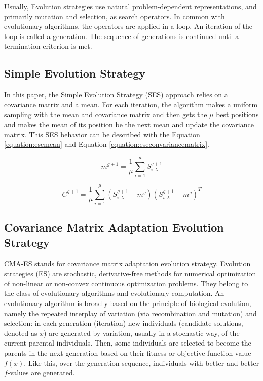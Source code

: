 Usually, Evolution strategies use natural problem-dependent representations, and primarily mutation and selection, as search operators. In common with evolutionary algorithms, the operators are applied in a loop. An iteration of the loop is called a generation. The sequence of generations is continued until a termination criterion is met.

\subsection{Simple Evolution Strategy}

In this paper, the Simple Evolution Strategy (SES) approach relies on a covariance matrix and a mean. For each iteration, the algorithm makes a uniform sampling with the mean and covariance matrix and then gets the $\mu$ best positions and makes the mean of its position be the next mean and update the covariance matrix. This SES behavior can be described with the Equation \ref{equation:esemean} and Equation \ref{equation:eseconvariancematrix}.

\begin{equation}
    \label{equation:esemean}
    m^{g+1} = \frac{1}{\mu} \sum_{i=1}^{\mu} S_{i:\lambda}^{g+1}
\end{equation}

\begin{equation}
    \label{equation:eseconvariancematrix}
    C^{g+1} = \frac{1}{\mu} \sum_{i=1}^{\mu} (S_{i:\lambda}^{g+1} - m^g) (S_{i:\lambda}^{g+1} - m^g)^T
\end{equation}

\subsection{Covariance Matrix Adaptation Evolution Strategy}

CMA-ES stands for covariance matrix adaptation evolution strategy. Evolution strategies (ES) are stochastic, derivative-free methods for numerical optimization of non-linear or non-convex continuous optimization problems. They belong to the class of evolutionary algorithms and evolutionary computation. An evolutionary algorithm is broadly based on the principle of biological evolution, namely the repeated interplay of variation (via recombination and mutation) and selection: in each generation (iteration) new individuals (candidate solutions, denoted as $x$) are generated by variation, usually in a stochastic way, of the current parental individuals. Then, some individuals are selected to become the parents in the next generation based on their fitness or objective function value $f(x)$. Like this, over the generation sequence, individuals with better and better $f$-values are generated.


